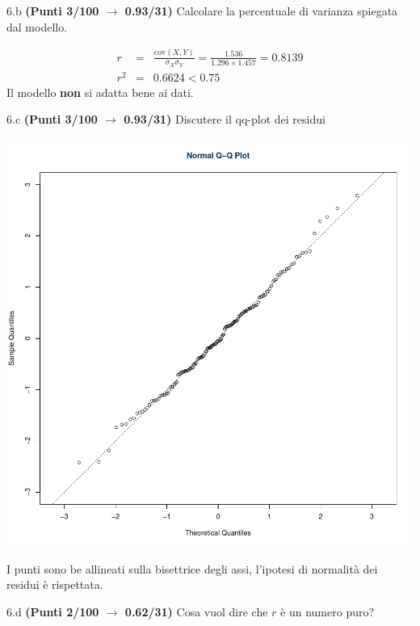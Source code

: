 \documentclass[
  11pt,
]{book}
\theoremstyle{mytheoremstyle}
\theoremstyle{mydefstyle}
\newenvironment{sol}
  {
  \begin{tcolorbox}[enhanced,breakable,arc=0.1mm,boxrule=1pt,colback=white,colframe=iblue,
  title=\bf \fontfamily{lmss}\selectfont \hspace{.5 cm} Soluzione,drop fuzzy shadow]

}{
\end{tcolorbox}
  }
\begin{document}
6.b \textbf{(Punti 3/100 \(\rightarrow\) 0.93/31)} Calcolare la percentuale di varianza spiegata dal modello.

\begin{sol}
\begin{eqnarray*}
r&=&\frac{\text{cov}(X,Y)}{\sigma_X\sigma_Y}=\frac{ 1.536 }{ 1.296 \times 1.457 }= 0.8139 \\r^2&=& 0.6624 < 0.75
\end{eqnarray*}
Il modello \textbf{non} si adatta bene ai dati.

\end{sol}

6.c \textbf{(Punti 3/100 \(\rightarrow\) 0.93/31)} Discutere il qq-plot dei residui

\begin{center}\includegraphics{Esami_passati_con_soluzioni_files/figure-latex/2021-7,-1} \end{center}

\begin{sol}
I punti sono be allineati sulla bisettrice degli assi, l'ipotesi di normalità dei residui è rispettata.

\end{sol}

6.d \textbf{(Punti 2/100 \(\rightarrow\) 0.62/31)} Cosa vuol dire che \(r\) è un numero puro?
\end{document}
